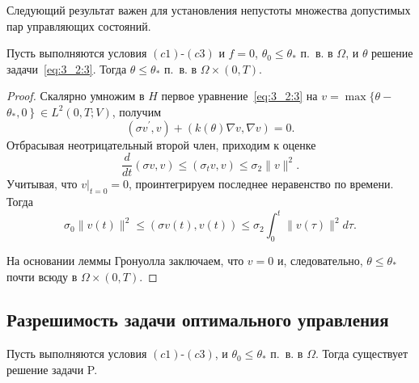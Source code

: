 Следующий результат важен для установления непустоты
множества допустимых пар управляющих состояний.

\begin{lemma}
    \label{lm:3_2:2}
    Пусть выполняются условия $(c1)$-$(c3)$ и
    $f=0$, $\theta_{0} \leq \theta_{*}$ п.\ в. в $\Omega$,
    и $\theta$ решение задачи~\eqref{eq:3_2:3}.
    Тогда $\theta \leq \theta_{*}$ п.\ в. в $\Omega \times(0, T)$.
\end{lemma}

\begin{proof}
    Скалярно умножим в $H$ первое уравнение~\eqref{eq:3_2:3} на
    $v=\max \{\theta-$ $\left.\theta_{*}, 0\right\} \in L^{2}(0, T ; V)$, получим
    \[
        \left(\sigma v^{\prime}, v\right)+(k(\theta) \nabla v, \nabla v)=0.
    \]
    Отбрасывая неотрицательный второй член, приходим к оценке
    \[ \frac{d}{d t}(\sigma v, v) \leq\left(\sigma_{t} v, v\right) \leq \sigma_{2}\|v\|^{2}. \]
    Учитывая, что $\left.v\right|_{t=0}=0$, проинтегрируем
    последнее неравенство по времени.
    Тогда
    \[
        \sigma_{0}\|v(t)\|^{2} \leq(\sigma v(t), v(t))
        \leq \sigma_{2} \int_{0}^{t}\|v(\tau)\|^{2} d \tau.
    \]

    На основании леммы Гронуолла заключаем,
    что $v=0$ и, следовательно, $\theta \leq \theta_{*}$ почти всюду в $\Omega\times(0,T)$.
\end{proof}

\subsection{Разрешимость задачи оптимального управления}
\label{subsec:ch3:sec2:subsec5}

\begin{theorem}
    \label{th:3_2:1}
    Пусть выполняются условия $(c1)$-$(c3)$, и $\theta_{0} \leq \theta_{*}$ п.\ в. в $\Omega$.
    Тогда существует решение задачи P\@.
\end{theorem}


